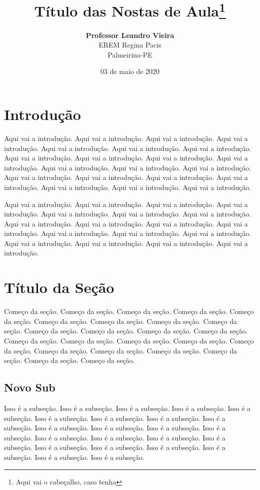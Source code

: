 \documentclass[oneside,a4paper,12pt]{article}
\title{\LINHAHORIZONTAL \\ Título das Nostas de Aula\footnote{Aqui vai o cabeçalho, caso tenha}}
\author{\textbf{Professor Leandro Vieira}\\EREM Regina Pacis\\Palmeirina-PE}
\date{03 de maio de 2020 \\ \LINHAHORIZONTAL}
\begin{document}
\maketitle

\tableofcontents

\section{Introdução}

Aqui vai a introdução. Aqui vai a introdução. Aqui vai a introdução.
Aqui vai a introdução. Aqui vai a introdução. Aqui vai a introdução.
Aqui vai a introdução. Aqui vai a introdução. Aqui vai a introdução.
Aqui vai a introdução. Aqui vai a introdução. Aqui vai a introdução.
Aqui vai a introdução. Aqui vai a introdução. Aqui vai a introdução.
Aqui vai a introdução. Aqui vai a introdução. Aqui vai a introdução.
Aqui vai a introdução. Aqui vai a introdução. Aqui vai a introdução.

Aqui vai a introdução. Aqui vai a introdução. Aqui vai a introdução.
Aqui vai a introdução. Aqui vai a introdução. Aqui vai a introdução.
Aqui vai a introdução. Aqui vai a introdução. Aqui vai a introdução.
Aqui vai a introdução. Aqui vai a introdução. Aqui vai a introdução.
Aqui vai a introdução. Aqui vai a introdução. Aqui vai a introdução.
Aqui vai a introdução. Aqui vai a introdução. Aqui vai a introdução.


\section{Título da Seção}

Começo da seção. Começo da seção. Começo da seção. Começo da seção. Começo da seção. Começo da seção. Começo da seção. Começo da seção. Começo da seção. Começo da seção. Começo da seção. Começo da seção. Começo da seção. Começo da seção. Começo da seção. Começo da seção. Começo da seção. Começo da seção. Começo da seção. Começo da seção. Começo da seção. Começo da seção. Começo da seção. Começo da seção.

\subsection{Novo Sub}

Isso é a subseção. Isso é a subseção. Isso é a subseção. Isso é a subseção. Isso é a subseção. Isso é a subseção. Isso é a subseção. Isso é a subseção. Isso é a subseção. Isso é a subseção. Isso é a subseção. Isso é a subseção. Isso é a subseção. Isso é a subseção. Isso é a subseção. Isso é a subseção. Isso é a subseção. Isso é a subseção. Isso é a subseção. Isso é a subseção. Isso é a subseção. Isso é a subseção. Isso é a subseção. 
\end{document}
